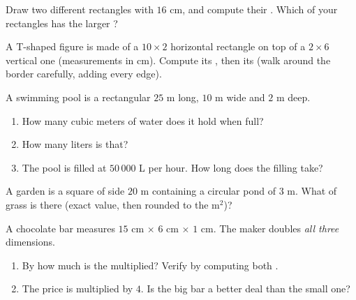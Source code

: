 \begin{exercise}[$\star$]\label{exo:g6:measure:8}
Draw two different rectangles with  $16$ cm, and compute their
. Which of your rectangles has the larger ?
\end{exercise}

\begin{exercise}[$\star\star$]\label{exo:g6:measure:9}
A T-shaped figure is made of a $10 \times 2$ horizontal rectangle on
top of a $2 \times 6$ vertical one (measurements in cm). Compute its
, then its  (walk around the border carefully, adding
every edge).
\end{exercise}

\begin{exercise}[$\star\star$]\label{exo:g6:measure:10}
A swimming pool is a rectangular  $25$ m long, $10$ m wide and
$2$ m deep.
\begin{enumerate}
  \item How many cubic meters of water does it hold when full?
  \item How many liters is that?
  \item The pool is filled at $50\,000$ L per hour. How long does the
        filling take?
\end{enumerate}
\end{exercise}

\begin{exercise}[$\star\star$]\label{exo:g6:measure:11}
A garden is a square of side $20$ m containing a circular pond of
 $3$ m. What  of grass is there (exact value, then rounded
to the m$^2$)?
\end{exercise}

\begin{exercise}[$\star\star\star$]\label{exo:g6:measure:12}
A chocolate bar measures $15$ cm $\times$ $6$ cm $\times$ $1$ cm.
The maker doubles \emph{all three} dimensions.
\begin{enumerate}
  \item By how much is the  multiplied? Verify by computing both
        .
  \item The price is multiplied by $4$. Is the big bar a better deal
        than the small one?
\end{enumerate}
\end{exercise}

